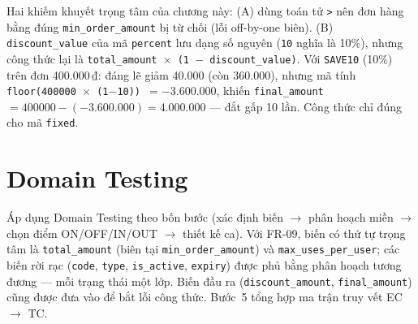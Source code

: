 \documentclass[12pt, a4paper]{report}
\begin{document}
\begin{notebox}
Hai khiếm khuyết trọng tâm của chương này: (A) dùng toán tử \texttt{>} nên đơn hàng
bằng đúng \texttt{min\_order\_amount} bị từ chối (lỗi off-by-one biên). (B)
\texttt{discount\_value} của mã \texttt{percent} lưu dạng số nguyên (\texttt{10} nghĩa là 10\%),
nhưng công thức lại là \texttt{total\_amount $\times$ (1 $-$ discount\_value)}. Với
\texttt{SAVE10} (10\%) trên đơn 400.000\,₫: đáng lẽ giảm 40.000 (còn 360.000), nhưng mã tính
\texttt{floor(400000 $\times$ (1$-$10)) $= -3.600.000$}, khiến \texttt{final\_amount $=
400000 - (-3.600.000) = 4.000.000$} — đắt gấp 10 lần. Công thức chỉ đúng cho mã
\texttt{fixed}.
\end{notebox}

\section{Domain Testing}

Áp dụng Domain Testing theo bốn bước (xác định biến $\to$ phân hoạch miền
$\to$ chọn điểm ON/OFF/IN/OUT $\to$ thiết kế ca). Với FR-09, biến có thứ tự trọng tâm là
\texttt{total\_amount} (biên tại \texttt{min\_order\_amount}) và \texttt{max\_uses\_per\_user};
các biến rời rạc (\texttt{code}, \texttt{type}, \texttt{is\_active}, \texttt{expiry}) được phủ
bằng phân hoạch tương đương --- mỗi trạng thái một lớp. Biến đầu ra (\texttt{discount\_amount},
\texttt{final\_amount}) cũng được đưa vào để bắt lỗi công thức. Bước~5 tổng hợp ma trận truy vết
EC $\to$ TC.
\end{document}
